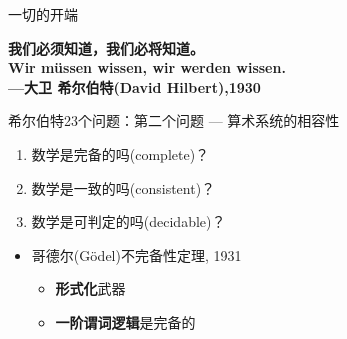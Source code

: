 \documentclass[UTF8]{ctexbeamer}
\begin{document}
\begin{frame}{一切的开端}
\begin{center}
\large\textbf{我们必须知道，我们必将知道。}\\
\textbf{Wir m\"ussen wissen, wir werden wissen.}\\
\qquad\qquad\qquad\qquad\qquad\textbf{---大卫 希尔伯特(David Hilbert),1930}
\end{center}
\pause
希尔伯特23个问题：第二个问题 --- 算术系统的相容性
\begin{enumerate}
	\item 数学是完备的吗(complete)？%
	\item 数学是一致的吗(consistent)？%
	\item 数学是可判定的吗(decidable)？%
\end{enumerate}
\pause
\begin{itemize}[<+->]
	\item 哥德尔(G\"odel)不完备性定理, 1931
	\begin{itemize}
		\item \textbf{形式化}武器
		\item \textbf{一阶谓词逻辑}是完备的
	\end{itemize}
\end{itemize}
\end{frame}
\end{document}
